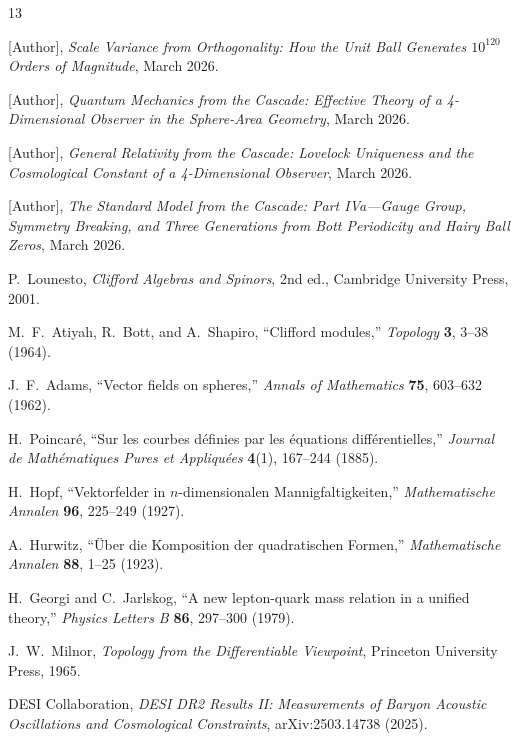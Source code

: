 \documentclass[12pt,a4paper]{article}
\begin{document}
\begin{thebibliography}{13}

 {[Author]}, \textit{Scale Variance from Orthogonality: How the Unit Ball Generates $10^{120}$ Orders of Magnitude}, March 2026.

 {[Author]}, \textit{Quantum Mechanics from the Cascade: Effective Theory of a 4-Dimensional Observer in the Sphere-Area Geometry}, March 2026.

 {[Author]}, \textit{General Relativity from the Cascade: Lovelock Uniqueness and the Cosmological Constant of a 4-Dimensional Observer}, March 2026.

 {[Author]}, \textit{The Standard Model from the Cascade: Part IVa---Gauge Group, Symmetry Breaking, and Three Generations from Bott Periodicity and Hairy Ball Zeros}, March 2026.

 P.~Lounesto, \textit{Clifford Algebras and Spinors}, 2nd ed., Cambridge University Press, 2001.

 M.~F.~Atiyah, R.~Bott, and A.~Shapiro, ``Clifford modules,'' \textit{Topology} \textbf{3}, 3--38 (1964).

 J.~F.~Adams, ``Vector fields on spheres,'' \textit{Annals of Mathematics} \textbf{75}, 603--632 (1962).

 H.~Poincar\'e, ``Sur les courbes d\'efinies par les \'equations diff\'erentielles,'' \textit{Journal de Math\'ematiques Pures et Appliqu\'ees} \textbf{4}(1), 167--244 (1885).

 H.~Hopf, ``Vektorfelder in $n$-dimensionalen Mannigfaltigkeiten,'' \textit{Mathematische Annalen} \textbf{96}, 225--249 (1927).

 A.~Hurwitz, ``\"Uber die Komposition der quadratischen Formen,'' \textit{Mathematische Annalen} \textbf{88}, 1--25 (1923).

 H.~Georgi and C.~Jarlskog, ``A new lepton-quark mass relation in a unified theory,'' \textit{Physics Letters B} \textbf{86}, 297--300 (1979).

 J.~W.~Milnor, \textit{Topology from the Differentiable Viewpoint}, Princeton University Press, 1965.

 DESI Collaboration, \textit{DESI DR2 Results II: Measurements of Baryon Acoustic Oscillations and Cosmological Constraints}, arXiv:2503.14738 (2025).

\end{thebibliography}
\end{document}
